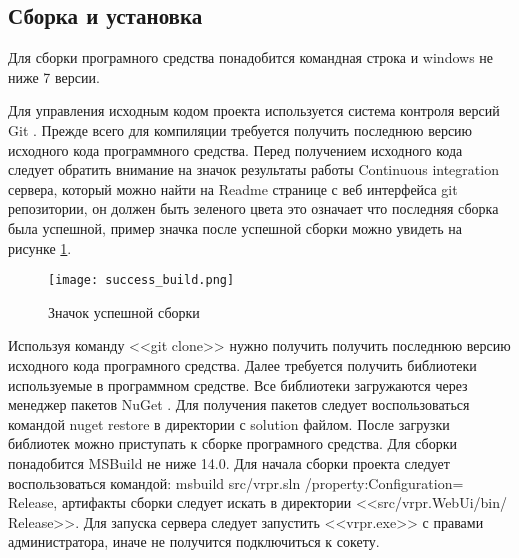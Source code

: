 \subsection{Сборка и установка}
\label{sub:creation:build_and_install}

Для сборки програмного средства понадобится командная строка и windows не ниже 7 версии.

Для управления исходным кодом проекта используется система контроля версий Git \cite{git}. Прежде всего для компиляции требуется получить последнюю версию исходного кода программного средства. Перед получением исходного кода следует обратить внимание на значок результаты работы Continuous integration сервера, который можно найти на Readme странице с веб интерфейса git репозитории, он должен быть зеленого цвета это означает что последняя сборка была успешной, пример значка после успешной сборки можно увидеть на рисунке \ref{fig:domain:recognition:installation:success_build}.
\begin{figure}[ht] 
    \centering
    \texttt{[image: success\_build.png]}  
    \caption{Значок успешной сборки}
    \label{fig:domain:recognition:installation:success_build}
\end{figure}

Используя команду <<git clone>> нужно получить получить последнюю версию исходного кода програмного средства. Далее требуется получить библиотеки используемые в программном средстве. Все библиотеки загружаются через менеджер пакетов NuGet \cite{nuget}. Для получения пакетов следует воспользоваться командой nuget restore в директории с solution файлом. После загрузки библиотек можно приступать к сборке програмного средства. Для сборки понадобится MSBuild не ниже 14.0. Для начала сборки проекта следует воспользоваться командой: msbuild src/vrpr.sln  /property:Configuration= Release, артифакты сборки следует искать в директории <<src/vrpr.WebUi/bin/ Release>>. Для запуска сервера следует запустить <<vrpr.exe>> с правами администратора, иначе не получится подключиться к сокету.